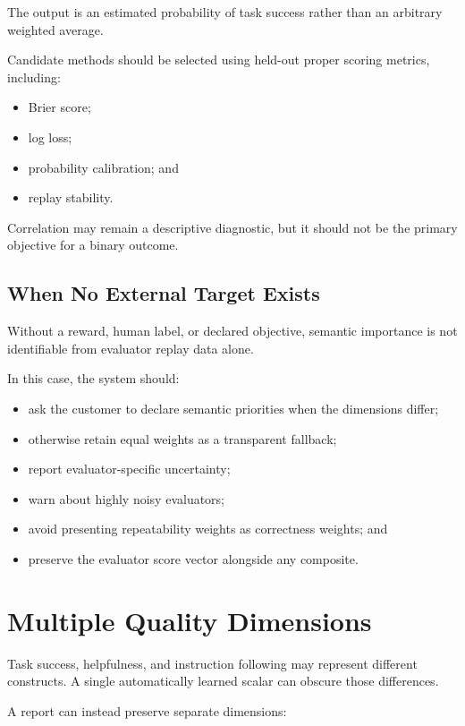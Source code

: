 \documentclass[11pt]{article}
\begin{document}
The output is an estimated probability of task success rather than an
arbitrary weighted average.

Candidate methods should be selected using held-out proper scoring metrics,
including:

\begin{itemize}
    \item Brier score;
    \item log loss;
    \item probability calibration; and
    \item replay stability.
\end{itemize}

Correlation may remain a descriptive diagnostic, but it should not be the
primary objective for a binary outcome.

\subsection{When No External Target Exists}

Without a reward, human label, or declared objective, semantic importance is
not identifiable from evaluator replay data alone.

In this case, the system should:

\begin{itemize}
    \item ask the customer to declare semantic priorities when the dimensions
    differ;
    \item otherwise retain equal weights as a transparent fallback;
    \item report evaluator-specific uncertainty;
    \item warn about highly noisy evaluators;
    \item avoid presenting repeatability weights as correctness weights; and
    \item preserve the evaluator score vector alongside any composite.
\end{itemize}

\section{Multiple Quality Dimensions}

Task success, helpfulness, and instruction following may represent different
constructs. A single automatically learned scalar can obscure those
differences.

A report can instead preserve separate dimensions:
\end{document}
